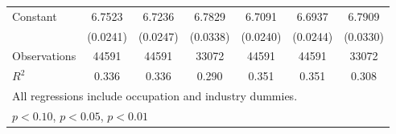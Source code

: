 {\begin{longtable}{l*{6}{c}}
Constant            &      6.7523\sym{***}&      6.7236\sym{***}&      6.7829\sym{***}&      6.7091\sym{***}&      6.6937\sym{***}&      6.7909\sym{***}\\
                    &    (0.0241)         &    (0.0247)         &    (0.0338)         &    (0.0240)         &    (0.0244)         &    (0.0330)         \\
\hline  
Observations        &       44591         &       44591         &       33072         &       44591         &       44591         &       33072         \\
\(R^{2}\)           &       0.336         &       0.336         &       0.290         &       0.351         &       0.351         &       0.308         \\
\hline  
\multicolumn{7}{l}{\footnotesize All regressions include occupation and industry dummies.}\\
\multicolumn{7}{l}{\footnotesize \sym{*} \(p<0.10\), \sym{**} \(p<0.05\), \sym{***} \(p<0.01\)}\\
\end{longtable}
}
